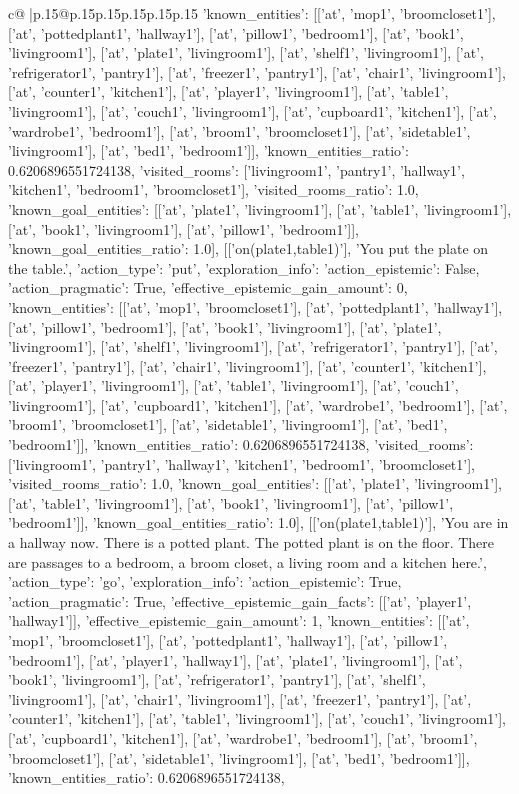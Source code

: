 \documentclass{article}
\begin{document}
{\begin{supertabular}{c@{$\;$}|p{.15\linewidth}@{}p{.15\linewidth}p{.15\linewidth}p{.15\linewidth}p{.15\linewidth}p{.15\linewidth}}
{{{'known_entities': [['at', 'mop1', 'broomcloset1'], ['at', 'pottedplant1', 'hallway1'], ['at', 'pillow1', 'bedroom1'], ['at', 'book1', 'livingroom1'], ['at', 'plate1', 'livingroom1'], ['at', 'shelf1', 'livingroom1'], ['at', 'refrigerator1', 'pantry1'], ['at', 'freezer1', 'pantry1'], ['at', 'chair1', 'livingroom1'], ['at', 'counter1', 'kitchen1'], ['at', 'player1', 'livingroom1'], ['at', 'table1', 'livingroom1'], ['at', 'couch1', 'livingroom1'], ['at', 'cupboard1', 'kitchen1'], ['at', 'wardrobe1', 'bedroom1'], ['at', 'broom1', 'broomcloset1'], ['at', 'sidetable1', 'livingroom1'], ['at', 'bed1', 'bedroom1']], 'known_entities_ratio': 0.6206896551724138, 'visited_rooms': ['livingroom1', 'pantry1', 'hallway1', 'kitchen1', 'bedroom1', 'broomcloset1'], 'visited_rooms_ratio': 1.0, 'known_goal_entities': [['at', 'plate1', 'livingroom1'], ['at', 'table1', 'livingroom1'], ['at', 'book1', 'livingroom1'], ['at', 'pillow1', 'bedroom1']], 'known_goal_entities_ratio': 1.0}}], [['on(plate1,table1)'], 'You put the plate on the table.', {'action_type': 'put', 'exploration_info': {'action_epistemic': False, 'action_pragmatic': True, 'effective_epistemic_gain_amount': 0, 'known_entities': [['at', 'mop1', 'broomcloset1'], ['at', 'pottedplant1', 'hallway1'], ['at', 'pillow1', 'bedroom1'], ['at', 'book1', 'livingroom1'], ['at', 'plate1', 'livingroom1'], ['at', 'shelf1', 'livingroom1'], ['at', 'refrigerator1', 'pantry1'], ['at', 'freezer1', 'pantry1'], ['at', 'chair1', 'livingroom1'], ['at', 'counter1', 'kitchen1'], ['at', 'player1', 'livingroom1'], ['at', 'table1', 'livingroom1'], ['at', 'couch1', 'livingroom1'], ['at', 'cupboard1', 'kitchen1'], ['at', 'wardrobe1', 'bedroom1'], ['at', 'broom1', 'broomcloset1'], ['at', 'sidetable1', 'livingroom1'], ['at', 'bed1', 'bedroom1']], 'known_entities_ratio': 0.6206896551724138, 'visited_rooms': ['livingroom1', 'pantry1', 'hallway1', 'kitchen1', 'bedroom1', 'broomcloset1'], 'visited_rooms_ratio': 1.0, 'known_goal_entities': [['at', 'plate1', 'livingroom1'], ['at', 'table1', 'livingroom1'], ['at', 'book1', 'livingroom1'], ['at', 'pillow1', 'bedroom1']], 'known_goal_entities_ratio': 1.0}}], [['on(plate1,table1)'], 'You are in a hallway now. There is a potted plant. The potted plant is on the floor. There are passages to a bedroom, a broom closet, a living room and a kitchen here.', {'action_type': 'go', 'exploration_info': {'action_epistemic': True, 'action_pragmatic': True, 'effective_epistemic_gain_facts': [['at', 'player1', 'hallway1']], 'effective_epistemic_gain_amount': 1, 'known_entities': [['at', 'mop1', 'broomcloset1'], ['at', 'pottedplant1', 'hallway1'], ['at', 'pillow1', 'bedroom1'], ['at', 'player1', 'hallway1'], ['at', 'plate1', 'livingroom1'], ['at', 'book1', 'livingroom1'], ['at', 'refrigerator1', 'pantry1'], ['at', 'shelf1', 'livingroom1'], ['at', 'chair1', 'livingroom1'], ['at', 'freezer1', 'pantry1'], ['at', 'counter1', 'kitchen1'], ['at', 'table1', 'livingroom1'], ['at', 'couch1', 'livingroom1'], ['at', 'cupboard1', 'kitchen1'], ['at', 'wardrobe1', 'bedroom1'], ['at', 'broom1', 'broomcloset1'], ['at', 'sidetable1', 'livingroom1'], ['at', 'bed1', 'bedroom1']], 'known_entities_ratio': 0.6206896551724138, }}}
\end{supertabular}}
\end{document}
